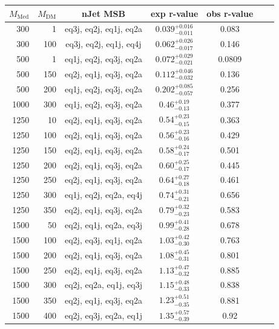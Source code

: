 \begin{table}
  \centering
  \begin{tabular}{rrccccc}
    \hline\hline
    $M_{\text{Med}}$ & $M_{\text{DM}}$ & nJet MSB & exp r-value & obs r-value \\
    \hline
      300 &   1 & eq3j, eq2j, eq1j, eq2a & $0.039_{-0.011}^{+0.016}$ & 0.083 \\
      300 & 100 & eq3j, eq2j, eq1j, eq4j & $0.062_{-0.017}^{+0.026}$ & 0.146 \\
      500 &   1 & eq1j, eq2j, eq3j, eq2a & $0.072_{-0.021}^{+0.029}$ & 0.0809 \\
      500 & 150 & eq2j, eq1j, eq3j, eq2a & $0.112_{-0.032}^{+0.046}$ & 0.136 \\
      500 & 200 & eq1j, eq2j, eq3j, eq2a & $0.202_{-0.057}^{+0.085}$ & 0.256 \\
     1000 & 300 & eq1j, eq2j, eq3j, eq2a & $0.46_{-0.13}^{+0.19}$    & 0.377 \\
     1250 &  10 & eq2j, eq1j, eq3j, eq2a & $0.54_{-0.15}^{+0.23}$    & 0.363 \\
     1250 & 100 & eq2j, eq1j, eq3j, eq2a & $0.56_{-0.16}^{+0.23}$    & 0.429 \\
     1250 & 150 & eq2j, eq1j, eq3j, eq2a & $0.58_{-0.17}^{+0.24}$    & 0.501 \\
     1250 & 200 & eq2j, eq1j, eq3j, eq2a & $0.60_{-0.17}^{+0.25}$    & 0.445 \\
     1250 & 250 & eq2j, eq1j, eq3j, eq2a & $0.64_{-0.18}^{+0.27}$    & 0.461 \\
     1250 & 300 & eq1j, eq2j, eq2a, eq4j & $0.74_{-0.21}^{+0.31}$    & 0.656 \\
     1250 & 350 & eq2j, eq1j, eq3j, eq2a & $0.79_{-0.23}^{+0.32}$    & 0.583 \\
     1500 &  50 & eq2j, eq1j, eq2a, eq3j & $0.99_{-0.28}^{+0.41}$    & 0.678 \\
     1500 & 100 & eq2j, eq3j, eq1j, eq2a & $1.03_{-0.30}^{+0.42}$    & 0.763 \\
     1500 & 200 & eq2j, eq1j, eq3j, eq2a & $1.08_{-0.31}^{+0.45}$    & 0.801 \\
     1500 & 250 & eq2j, eq1j, eq3j, eq2a & $1.13_{-0.32}^{+0.47}$    & 0.885 \\
     1500 & 300 & eq2j, eq2a, eq1j, eq3j & $1.15_{-0.33}^{+0.48}$    & 0.838 \\
     1500 & 350 & eq2j, eq1j, eq3j, eq2a & $1.23_{-0.35}^{+0.51}$    & 0.881 \\
     1500 & 400 & eq2j, eq3j, eq2a, eq1j & $1.35_{-0.39}^{+0.57}$    & 0.92 \\


\end{tabular}
\end{table}
